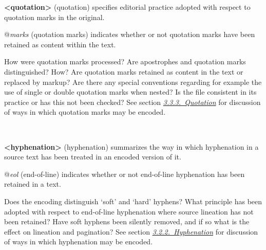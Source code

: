\begin{description}
\begin{sansreflist}
\item [\textbf{<quotation>}] (quotation) specifies editorial practice adopted with respect to quotation marks in the original.\hfil\\[-10pt]\begin{sansreflist}
    \item[@{\itshape marks}]
  (quotation marks) indicates whether or not quotation marks have been retained as content within the text.
\end{sansreflist}  
\end{sansreflist}
 \par
How were quotation marks processed? Are apostrophes and quotation marks distinguished? How? Are quotation marks retained as content in the text or replaced by markup? Are there any special conventions regarding for example the use of single or double quotation marks when nested? Is the file consistent in its practice or has this not been checked? See section \textit{\hyperref[COHQQ]{3.3.3.\ Quotation}} for discussion of ways in which quotation marks may be encoded.
\item[{\hyperlink{TEI.hyphenation}{}}]\hspace{1em}\hfill\linebreak
\mbox{}\\[-10pt] 
\begin{sansreflist}
  
\item [\textbf{<hyphenation>}] (hyphenation) summarizes the way in which hyphenation in a source text has been treated in an encoded version of it.\hfil\\[-10pt]\begin{sansreflist}
    \item[@{\itshape eol}]
  (end-of-line) indicates whether or not end-of-line hyphenation has been retained in a text.
\end{sansreflist}  
\end{sansreflist}
 \par
Does the encoding distinguish ‘soft’ and ‘hard’ hyphens? What principle has been adopted with respect to end-of-line hyphenation where source lineation has not been retained? Have soft hyphens been silently removed, and if so what is the effect on lineation and pagination? See section \textit{\hyperref[COPU-2]{3.2.2.\ Hyphenation}} for discussion of ways in which hyphenation may be encoded.
\item[{\hyperlink{TEI.segmentation}{}}]\hspace{1em}\hfill\linebreak
\mbox{}\\[-10pt] 
\begin{sansreflist}
  

\end{sansreflist}
\end{description}
